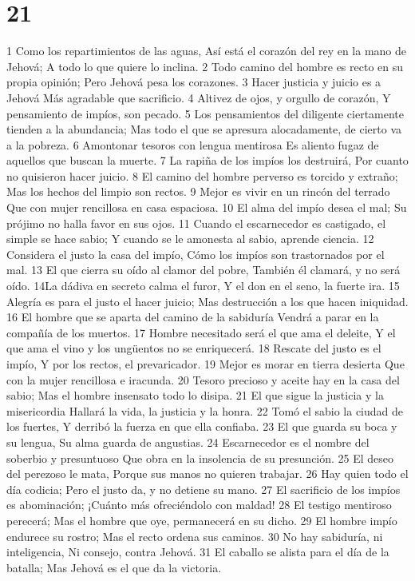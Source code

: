 \chapter{21}

1 Como los repartimientos de las aguas,
Así está el corazón del rey en la mano de Jehová;
A todo lo que quiere lo inclina.
2 Todo camino del hombre es recto en su propia opinión;
Pero Jehová pesa los corazones.
3 Hacer justicia y juicio es a Jehová
Más agradable que sacrificio.
4 Altivez de ojos, y orgullo de corazón,
Y pensamiento de impíos, son pecado.
5 Los pensamientos del diligente ciertamente tienden a la abundancia;
Mas todo el que se apresura alocadamente, de cierto va a la pobreza.
6 Amontonar tesoros con lengua mentirosa
Es aliento fugaz de aquellos que buscan la muerte.
7 La rapiña de los impíos los destruirá, 
Por cuanto no quisieron hacer juicio.
8 El camino del hombre perverso es torcido y extraño;
Mas los hechos del limpio son rectos.
9 Mejor es vivir en un rincón del terrado
Que con mujer rencillosa en casa espaciosa.
10 El alma del impío desea el mal;
Su prójimo no halla favor en sus ojos.
11 Cuando el escarnecedor es castigado, el simple se hace sabio;
Y cuando se le amonesta al sabio, aprende ciencia.
12 Considera el justo la casa del impío,
Cómo los impíos son trastornados por el mal.
13 El que cierra su oído al clamor del pobre,
También él clamará, y no será oído.
14La dádiva en secreto calma el furor,
Y el don en el seno, la fuerte ira.
15 Alegría es para el justo el hacer juicio;
Mas destrucción a los que hacen iniquidad.
16 El hombre que se aparta del camino de la sabiduría
Vendrá a parar en la compañía de los muertos.
17 Hombre necesitado será el que ama el deleite,
Y el que ama el vino y los ungüentos no se enriquecerá. 
18 Rescate del justo es el impío,
Y por los rectos, el prevaricador.
19 Mejor es morar en tierra desierta
Que con la mujer rencillosa e iracunda.
20 Tesoro precioso y aceite hay en la casa del sabio;
Mas el hombre insensato todo lo disipa.
21 El que sigue la justicia y la misericordia
Hallará la vida, la justicia y la honra.
22 Tomó el sabio la ciudad de los fuertes,
Y derribó la fuerza en que ella confiaba.
23 El que guarda su boca y su lengua,
Su alma guarda de angustias.
24 Escarnecedor es el nombre del soberbio y presuntuoso
Que obra en la insolencia de su presunción. 
25 El deseo del perezoso le mata,
Porque sus manos no quieren trabajar.
26 Hay quien todo el día codicia;
Pero el justo da, y no detiene su mano.
27 El sacrificio de los impíos es abominación;
¡Cuánto más ofreciéndolo con maldad!
28 El testigo mentiroso perecerá;
Mas el hombre que oye, permanecerá en su dicho.
29 El hombre impío endurece su rostro;
Mas el recto ordena sus caminos.
30 No hay sabiduría, ni inteligencia,
Ni consejo, contra Jehová.
31 El caballo se alista para el día de la batalla;
Mas Jehová es el que da la victoria.

